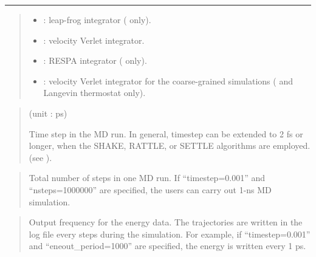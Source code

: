 \documentclass[a4paper,11pt,oneside,english]{sphinxmanual}
\begin{document}
\bigskip\hrule\bigskip


 
\begin{quote}

\begin{itemize}
\item {} 
: leap-frog integrator ( only).

\item {} 
: velocity Verlet integrator.

\item {} 
: RESPA integrator ( only).

\item {} 
: velocity Verlet integrator for the coarse-grained simulations ( and Langevin thermostat only).

\end{itemize}
\end{quote}

 
\begin{quote}

 (unit : ps)

Time step in the MD run.
In general, timestep can be extended to 2 fs or longer,
when the SHAKE, RATTLE, or SETTLE algorithms are employed.
(see {\hyperref[\detokenize{08_Constraints:constraints}]{}}).
\end{quote}

 
\begin{quote}


Total number of steps in one MD run.
If “timestep=0.001” and “nsteps=1000000” are specified,
the users can carry out 1-ns MD simulation.
\end{quote}

 
\begin{quote}


Output frequency for the energy data. The trajectories are written
in the log file every  steps during the simulation.
For example, if “timestep=0.001” and “eneout\_period=1000” are specified,
the energy is written every 1 ps.
\end{quote}
\end{document}
